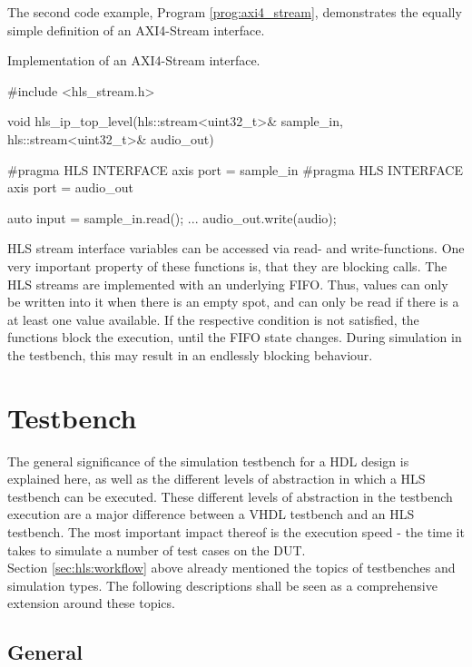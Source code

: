 The second code example, Program \ref{prog:axi4_stream}, demonstrates the equally simple definition of an AXI4-Stream interface.

\begin{program}
  \caption{Implementation of an AXI4-Stream interface.}
  \label{prog:axi4_stream}
\begin{CppCode}
 #include <hls_stream.h>

 void hls_ip_top_level(hls::stream<uint32_t>& sample_in,
                       hls::stream<uint32_t>& audio_out) {
     #pragma HLS INTERFACE axis port = sample_in
     #pragma HLS INTERFACE axis port = audio_out

     auto input = sample_in.read();
     ...
     audio_out.write(audio);
 }
\end{CppCode}
\end{program}

HLS stream interface variables can be accessed via read- and write-functions.
One very important property of these functions is, that they are blocking calls.
The HLS streams are implemented with an underlying FIFO.
Thus, values can only be written into it when there is an empty spot, and can only be read if there is a at least one value available.
If the respective condition is not satisfied, the functions block the execution, until the FIFO state changes.
During simulation in the testbench, this may result in an endlessly blocking behaviour.

\section{Testbench}

The general significance of the simulation testbench for a HDL design is explained here, as well as the different levels of abstraction in which a HLS testbench can be executed.
These different levels of abstraction in the testbench execution are a major difference between a VHDL testbench and an HLS testbench.
The most important impact thereof is the execution speed - the time it takes to simulate a number of test cases on the DUT.\\

Section \ref{sec:hls:workflow} above already mentioned the topics of testbenches and simulation types.
The following descriptions shall be seen as a comprehensive extension around these topics.

\subsection{General}
\label{sub:hls:testbench:general}

